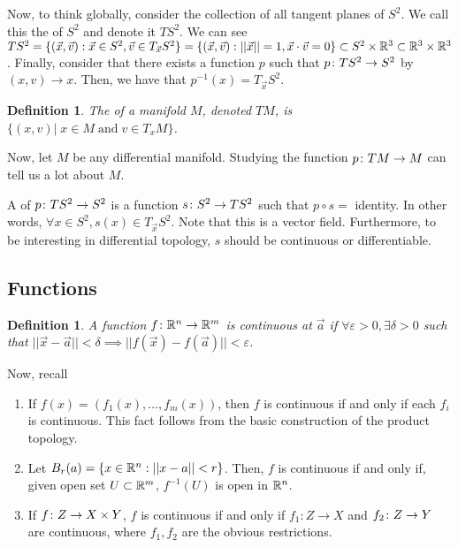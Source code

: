 \documentclass[11pt]{amsbook}
\theoremstyle{mystyle} %
\newtheorem{defi}[thm]{Definition}
\numberwithin{thm}{section}
\renewcommand{\epsilon}{\varepsilon}
\begin{document}
\begin{example}
	Now, to think globally, consider the collection of all tangent planes of
	$S^2$. We call this the  of $S^2$ and denote it
	$TS^2$. We can see $TS^2 = \{(\vec{x}, \vec{v}): \vec{x} \in S^2, \vec{v}
	\in T_{\vec{x}} S^2\} = \{(\vec{x},\vec{v}) : ||\vec{x}|| = 1, \vec{x}
	\cdot \vec{v} = 0\} \subset S^2 \times {\mathbb R}^3 \subset {\mathbb R}^3 \times {\mathbb R}^3$.
	Finally, consider that there exists a function $p$ such that $p\colon TS^2 \to
	S^2$ by $(x,v) \to x$. Then, we have that $p^{-1}(x) = T_{\vec{x}}S^2$.
\end{example}
\begin{defi}
	The  of a manifold $M$, denoted $TM$, is $\{ (x,v) |\; x \in M \;\text{and}\; v \in T_xM \}$.
\end{defi}

Now, let $M$ be any differential manifold. Studying the function $p\colon TM \to M$
can tell us a lot about $M$.

\begin{example}
	A  of $p\colon TS^2 \to S^2$ is a function $s\colon S^2 \to TS^2$ such
	that $p \circ s =$ identity. In other words, $\forall x \in S^2, s(x) \in
	T_{\vec{x}}S^2$. Note that this is a vector field. Furthermore, to be
	interesting in differential topology, $s$ should be continuous or
	differentiable.
\end{example}



\subsection{Functions}

\begin{defi}
	A function $f\colon {\mathbb R}^n \to {\mathbb R}^m$ is continuous at $\vec{a}$ if $\forall
	\epsilon > 0, \exists \delta > 0$ such that $||\vec{x}-\vec{a}|| < \delta
	\implies ||f(\vec{x}) - f(\vec{a})|| < \epsilon$.
\end{defi}
Now, recall \begin{enumerate}
	\item If $f(x) = (f_1(x), \ldots, f_m(x))$, then $f$ is continuous if and
		only if each $f_i$ is continuous. This fact follows from the basic
		construction of the product topology.
	\item Let $B_r(a) = \{x \in {\mathbb R}^n : ||x-a|| < r\}$. Then, $f$ is continuous
		if and only if, given open set $U \subset {\mathbb R}^m$, $f^{-1}(U)$ is open in
		${\mathbb R}^n$.
	\item If $f\colon Z \to X \times Y$, $f$ is continuous if and only if $f_1: Z
		\to X$ and $f_2\colon Z \to Y$ are continuous, where $f_1, f_2$ are the
		obvious restrictions.
\end{enumerate}
\end{document}
